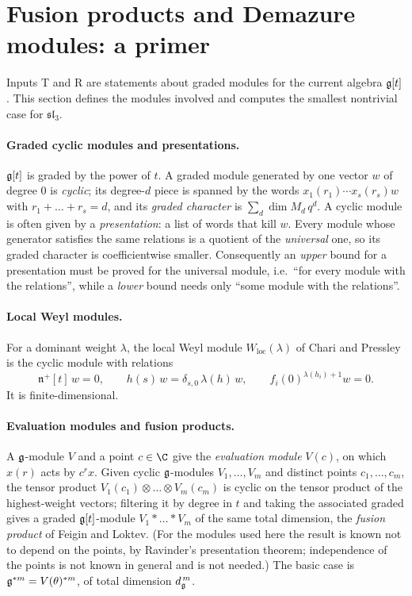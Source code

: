 \section{Fusion products and Demazure modules: a primer}\label{l27:sec:fusionprimer}

Inputs T and R are statements about graded modules for the current algebra $\mathfrak g[t]$. This section defines
the modules involved and computes the smallest nontrivial case for $\mathfrak{sl}_3$.

\paragraph{Graded cyclic modules and presentations.} $\mathfrak g[t]$ is graded by the power of $t$. A graded module
generated by one vector $w$ of degree $0$ is \emph{cyclic}; its degree-$d$ piece is spanned by the words
$x_1(r_1)\cdots x_s(r_s)w$ with $r_1+\dots+r_s=d$, and its \emph{graded character} is $\sum_d\dim M_d\,q^d$. A cyclic module is
often given by a \emph{presentation}: a list of words that kill $w$. Every module whose generator satisfies the same relations
is a quotient of the \emph{universal} one, so its graded character is coefficientwise smaller. Consequently an \emph{upper}
bound for a presentation must be proved for the universal module, i.e.\ ``for every module with the relations'', while a
\emph{lower} bound needs only ``some module with the relations''.

\paragraph{Local Weyl modules.} For a dominant weight $\lambda$, the local Weyl module $W_{\mathrm{loc}}(\lambda)$ of Chari
and Pressley is the cyclic module with relations
\begin{equation*}
\mathfrak n^+[t]\,w=0,\qquad h(s)\,w=\delta_{s,0}\,\lambda(h)\,w,\qquad f_i(0)^{\lambda(h_i)+1}w=0 .
\end{equation*}
It is finite-dimensional.

\paragraph{Evaluation modules and fusion products.} A $\mathfrak g$-module $V$ and a point $c\in\C$ give the
\emph{evaluation module} $V(c)$, on which $x(r)$ acts by $c^r x$. Given cyclic $\mathfrak g$-modules $V_1,\dots,V_m$
and distinct points $c_1,\dots,c_m$, the tensor product $V_1(c_1)\otimes\dots\otimes V_m(c_m)$ is cyclic on the tensor
product of the highest-weight vectors; filtering it by degree in $t$ and taking the associated graded gives a graded
$\mathfrak g[t]$-module $V_1*\dots*V_m$ of the same total dimension, the \emph{fusion product} of Feigin and Loktev. (For
the modules used here the result is known not to depend on the points, by Ravinder's presentation theorem; independence of
the points is not known in general and is not needed.) The basic case is $\mathfrak g^{*m}=V(\theta)^{*m}$, of total
dimension $d_{\mathfrak g}^{\,m}$.


